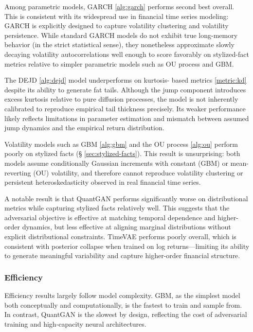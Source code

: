     Among parametric models, GARCH \ref{alg:garch} performs second 
    best overall. This is
    consistent with its widespread use in financial time series modeling:
    GARCH is explicitly designed to capture volatility clustering and
    volatility persistence. While standard GARCH models do not exhibit
    true long-memory behavior (in the strict statistical sense), they
    nonetheless approximate slowly decaying volatility autocorrelations
    well enough to score favorably on stylized-fact metrics relative to
    simpler parametric models such as OU process and GBM.

    The DEJD \ref{alg:dejd} model underperforms on kurtosis-
    based metrics \ref{metric:kd} despite its ability to generate fat tails.
    Although the jump component introduces excess kurtosis relative to pure
    diffusion processes, the model is not inherently calibrated to
    reproduce empirical tail thickness precisely. Its weaker performance
    likely reflects limitations in parameter estimation and
    mismatch between assumed jump dynamics and the empirical return
    distribution.

    Volatility models such as GBM \ref{alg:gbm} and the OU process \ref{alg:ou}
     perform poorly on
    stylized facts (§ \ref{sec:stylized-facts}). This result is unsurprising: 
    both models assume
    conditionally Gaussian increments with constant (GBM) or mean-reverting
    (OU) volatility, and therefore cannot reproduce volatility clustering
    or persistent heteroskedasticity observed in real financial time
    series.

    A notable result is that QuantGAN performs significantly worse on
    distributional metrics while capturing stylized facts relatively well.
    This suggests that the adversarial objective is effective at matching
    temporal dependence and higher-order dynamics, but less effective at
    aligning marginal distributions without explicit distributional
    constraints. TimeVAE performs poorly overall, which is consistent with
    posterior collapse when trained on log returns—limiting its ability to
    generate meaningful variability and capture higher-order financial
    structure.

    \subsubsection{Efficiency}

    Efficiency results largely follow model complexity. GBM, as the
    simplest model both conceptually and computationally, is the fastest
    to train and sample from. In contrast, QuantGAN is the slowest by
    design, reflecting the cost of adversarial training and high-capacity
    neural architectures.

